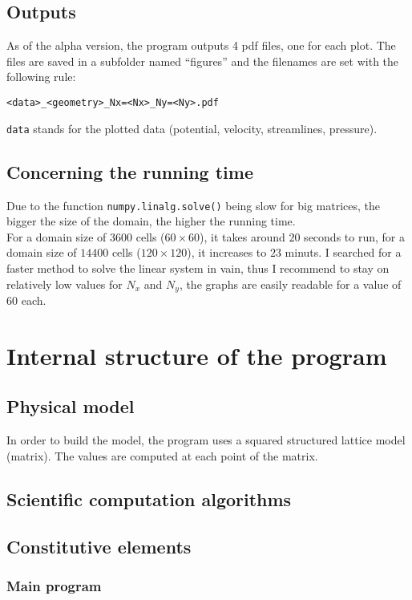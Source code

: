 \subsection{Outputs}
As of the alpha version, the program outputs 4 pdf files, one for each plot.
The files are saved in a subfolder named ``figures'' and the filenames are set
with the following rule:\\
\begin{center}
      \texttt{<data>_<geometry>_Nx=<Nx>_Ny=<Ny>.pdf}
\end{center}
\texttt{data} stands for the plotted data (potential, velocity,
streamlines, pressure).
\subsection{Concerning the running time}
Due to the function \texttt{numpy.linalg.solve()} being slow for
big matrices, the bigger the size of the domain, the higher the running time.\\
For a domain size of $\num{3600}$ cells ($\num{60} \times \num{60}$), it takes
around $\num{20}$ seconds to run, for a domain size of $\num{14400}$ cells
($\num{120} \times \num{120}$), it increases to $\num{23}$ minuts. 
\smallbreak
I searched for a faster method to solve the linear system in vain, thus I
recommend to stay on relatively low values for $N_x$ and $N_y$, the graphs are
easily readable for a value of $\num{60}$ each.\\

\section{Internal structure of the program}
\subsection{Physical model}
In order to build the model, the program uses a squared structured lattice
model (matrix). The values are computed at each point of the matrix.

\subsection{Scientific computation algorithms}


\subsection{Constitutive elements}
\subsubsection{Main program}

